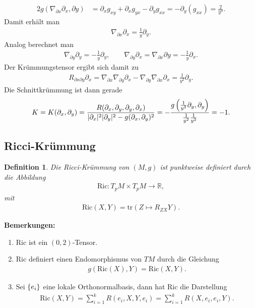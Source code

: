 \documentclass[12pt,a4paper]{article}
\def\R{\mathbb{R}}
\def\Ric{\mathrm{Ric}}
\def\tr{\mathrm{tr}}
\newtheorem{Definition}[Lemma]{Definition}
\begin{document}
\begin{enumerate}
\begin{align*}
 2g(\nabla_{\partial
x}\partial_x,\partial y) &= \partial_{x}g_{xy} + \partial_x g_{yx} - \partial_y
g_{xx} = - \partial_y(g_{xx}) =
\frac{2}{y^3}.
\end{align*}
Damit erh\"alt man 
\begin{align*}
\nabla_{\partial x}\partial_x = \frac{1}{y}\partial_y.
\end{align*}
Analog berechnet man
\begin{align*}
\nabla_{\partial y}\partial_y = -\frac{1}{y}\partial_y,\qquad
\nabla_{\partial y}\partial_x = \nabla_{\partial x}\partial y =
-\frac{1}{y}\partial_x.
\end{align*}
Der Kr\"ummungstensor ergibt sich damit zu
\begin{align*}
R_{\partial x\partial y}\partial_x = \nabla_{\partial x}\nabla_{\partial y}
\partial_x - \nabla_{\partial y}\nabla_{\partial x}
\partial_x =  \frac{1}{y^2}\partial_y.
\end{align*}
Die Schnittkr\"ummung ist dann gerade
\begin{align*}
K = K(\partial_x,\partial_y) =
\frac{R(\partial_x,\partial_y,\partial_y,\partial_x)}{|\partial_x|^2|\partial_y|^2
- g(\partial_x,\partial_y)^2} = 
-\frac{g\left(\frac{1}{y^2}\partial_y,\partial_y
\right)}{\frac{1}{y^2}\frac{1}{y^2}} = -1.
\end{align*}
\end{enumerate}

\bigskip

\subsection{Ricci-Kr\"ummung}

\begin{Definition}
Die \emph{Ricci-Kr\"ummung} von $(M,g)$ ist punktweise definiert durch die
Abbildung
\begin{align*}
\Ric: T_pM\times T_pM\to \R,
\end{align*}
mit
\begin{align*}
\Ric(X,Y) = \tr\left(Z\mapsto R_{ZX}Y\right).
\end{align*}
\end{Definition}

\bigskip

{\bf Bemerkungen:}
\begin{enumerate}
  \item $\Ric$ ist ein $(0,2)$-Tensor.
  \item $\Ric$ definiert einen Endomorphismus von $TM$ durch die Gleichung
\begin{align*}
g\left(\Ric(X),Y \right) = \Ric(X,Y).
\end{align*}
\item Sei $\{e_i\}$ eine lokale Orthonormalbasis, dann hat $\Ric$ die
Darstellung
\begin{align*}
\Ric(X,Y) = \sum_{i=1}^k R(e_i,X,Y,e_i) = \sum_{i=1}^k R(X,e_i,e_i,Y).
\end{align*}
\end{enumerate}
\end{document}

